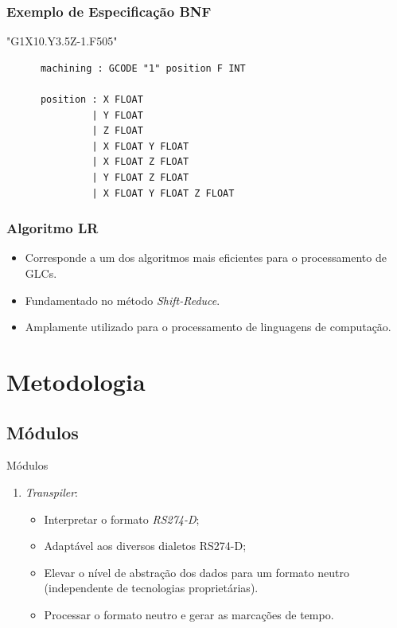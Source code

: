 \documentclass[aspectratio=169]{beamer}
\begin{document}
{\begin{frame}
\end{frame}


\begin{frame}[fragile]
  \frametitle{Exemplo de Especificação BNF}
  \begin{example}
   "G1X10.Y3.5Z-1.F505"
    \begin{lstlisting}
      machining : GCODE "1" position F INT

      position : X FLOAT
               | Y FLOAT
               | Z FLOAT
               | X FLOAT Y FLOAT
               | X FLOAT Z FLOAT
               | Y FLOAT Z FLOAT
               | X FLOAT Y FLOAT Z FLOAT
    \end{lstlisting}
  \end{example}  
\end{frame}


\begin{frame}
  \frametitle{Algoritmo LR}
  \begin{itemize}
    \item Corresponde a um dos algoritmos mais eficientes para o 
          processamento de GLCs.
    \item Fundamentado no método \emph{Shift-Reduce}.
    \item Amplamente utilizado para o processamento de linguagens de 
          computação.
  \end{itemize}

\end{frame}


\section{Metodologia}

\subsection{Módulos}

\begin{frame}{Módulos}
  \begin{enumerate}
    \item {
      \emph{Transpiler}: 
      \begin{itemize}
        \item Interpretar o formato \emph{RS274-D};
        \item Adaptável aos diversos dialetos RS274-D;
        \item Elevar o nível de abstração dos dados para um formato 
              neutro (independente de tecnologias proprietárias).
        \item Processar o formato neutro e gerar as marcações de tempo.
      \end{itemize}
    }


\end{enumerate}
\end{frame}}
\end{document}

